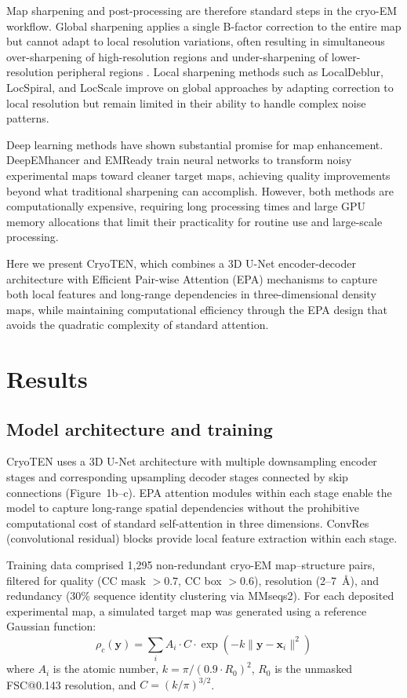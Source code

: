 \documentclass[11pt]{article}
\begin{document}
Map sharpening and post-processing are therefore standard steps in the cryo-EM workflow. Global sharpening applies a single B-factor correction to the entire map but cannot adapt to local resolution variations, often resulting in simultaneous over-sharpening of high-resolution regions and under-sharpening of lower-resolution peripheral regions \citep{rosenthal2003optimal}. Local sharpening methods such as LocalDeblur, LocSpiral, and LocScale improve on global approaches by adapting correction to local resolution but remain limited in their ability to handle complex noise patterns.

Deep learning methods have shown substantial promise for map enhancement. DeepEMhancer \citep{sanchez2021deepemhancer} and EMReady \citep{he2023emready} train neural networks to transform noisy experimental maps toward cleaner target maps, achieving quality improvements beyond what traditional sharpening can accomplish. However, both methods are computationally expensive, requiring long processing times and large GPU memory allocations that limit their practicality for routine use and large-scale processing.

Here we present CryoTEN, which combines a 3D U-Net encoder-decoder architecture with Efficient Pair-wise Attention (EPA) mechanisms to capture both local features and long-range dependencies in three-dimensional density maps, while maintaining computational efficiency through the EPA design that avoids the quadratic complexity of standard attention.

\section{Results}

\subsection{Model architecture and training}

CryoTEN uses a 3D U-Net architecture with multiple downsampling encoder stages and corresponding upsampling decoder stages connected by skip connections (Figure~1b--c). EPA attention modules within each stage enable the model to capture long-range spatial dependencies without the prohibitive computational cost of standard self-attention in three dimensions. ConvRes (convolutional residual) blocks provide local feature extraction within each stage.

Training data comprised 1,295 non-redundant cryo-EM map--structure pairs, filtered for quality (CC mask $> 0.7$, CC box $> 0.6$), resolution (2--7~\AA{}), and redundancy (30\% sequence identity clustering via MMseqs2). For each deposited experimental map, a simulated target map was generated using a reference Gaussian function:
\begin{equation}
    \rho_c(\mathbf{y}) = \sum_i A_i \cdot C \cdot \exp\left(-k \|\mathbf{y} - \mathbf{x}_i\|^2\right)
\end{equation}
where $A_i$ is the atomic number, $k = \pi / (0.9 \cdot R_0)^2$, $R_0$ is the unmasked FSC@0.143 resolution, and $C = (k/\pi)^{3/2}$.
\end{document}
